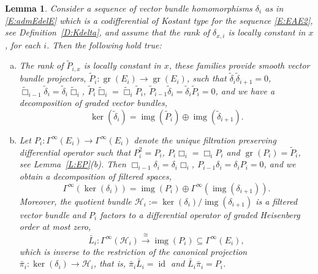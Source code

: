 \documentclass[reqno,12pt]{amsart}
\DeclareMathOperator{\img}{img}
\DeclareMathOperator{\gr}{gr}
\DeclareMathOperator{\id}{id}
\theoremstyle{plain}
\newtheorem{lemma}[theorem]{Lemma}
\theoremstyle{definition}
\begin{document}
\begin{lemma}\label{L:L}
Consider a sequence of vector bundle homomorphisms $\delta_i$ as in \eqref{E:admEdelE} which is a codifferential of Kostant type for the sequence \eqref{E:EAE2}, see Definition~\ref{D:Kdelta}, and assume that the rank of $\delta_{x,i}$ is locally constant in $x$, for each $i$.
Then the following hold true:

\begin{enumerate}[(a)]
\item
The rank of $\tilde P_{i,x}$ is locally constant in $x$, these families provide smooth vector bundle projectors, $\tilde P_i\colon\gr(E_i)\to\gr(E_i)$, such that $\tilde\delta_i\tilde\delta_{i+1}=0$, $\tilde\Box_{i-1}\tilde\delta_i=\tilde\delta_i\tilde\Box_i$, $\tilde P_i\tilde\Box_i=\tilde\Box_i\tilde P_i$, $\tilde P_{i-1}\tilde\delta_i=\tilde\delta_i\tilde P_i=0$, and we have a decomposition of graded  vector bundles,
\begin{equation}\label{E:kertddeco}
\ker(\tilde\delta_i)=\img(\tilde P_i)\oplus\img(\tilde\delta_{i+1}).
\end{equation}

\item
Let $P_i\colon\Gamma^\infty(E_i)\to\Gamma^\infty(E_i)$ denote the unique filtration preserving differential operator such that $P_i^2=P_i$, $P_i\Box_i=\Box_iP_i$ and $\gr(P_i)=\tilde P_i$, see Lemma~\ref{L:EP}(b).
Then $\Box_{i-1}\delta_i=\delta_i\Box_i$, $P_{i-1}\delta_i=\delta_iP_i=0$, and we obtain a decomposition of filtered spaces,
\begin{equation}\label{E:kertdeco}
\Gamma^\infty(\ker(\delta_i))=\img(P_i)\oplus\Gamma^\infty(\img(\delta_{i+1})).
\end{equation}
Moreover, the quotient bundle $\mathcal H_i:=\ker(\delta_i)/\img(\delta_{i+1})$ is a filtered vector bundle and $P_i$ factors to a differential operator of graded Heisenberg order at most zero,
$$
\bar L_i\colon\Gamma^\infty(\mathcal H_i)\xrightarrow\cong\img(P_i)\subseteq\Gamma^\infty(E_i),
$$
which is inverse to the restriction of the canonical projection $\bar\pi_i\colon\ker(\delta_i)\to\mathcal H_i$, that is, $\bar\pi_i\bar L_i=\id$ and $\bar L_i\bar\pi_i=P_i$.



\end{enumerate}
\end{lemma}
\end{document}
